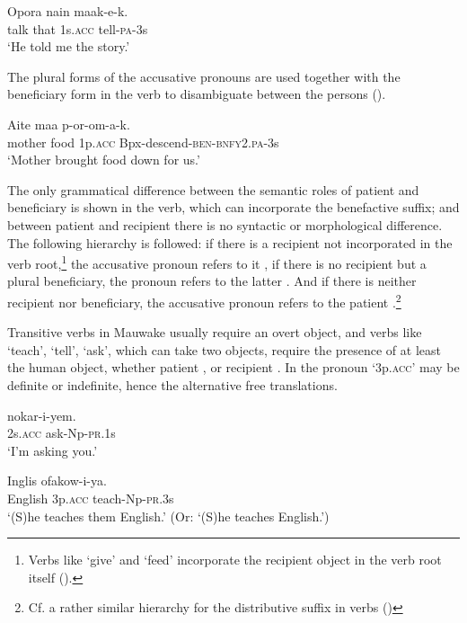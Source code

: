 \ea%
\label{ex:3:x550}
\gll Opora nain  maak-e-k. \\
talk that 1s.\textsc{acc} tell-\textsc{pa}-3s\\
\glt`He told me the story.' 
\z

The plural forms of the accusative pronouns are used together with the beneficiary form in the verb to disambiguate between the persons  ().

\ea%
\label{ex:3:x549}
\gll Aite maa  p-or-om-a-k. \\
mother food 1p.\textsc{acc} Bpx-descend-\textsc{ben}-\textsc{bnfy}2.\textsc{pa}-3s\\
\glt`Mother brought food down for us.'
\z

The only grammatical difference between the semantic roles of patient and beneficiary is shown in the verb, which can incorporate the benefactive suffix; and between patient and recipient there is no syntactic or morphological difference. The following hierarchy is followed: if there is a recipient not incorporated in the verb root,\footnote{Verbs like `give' and `feed' incorporate the recipient object in the verb root itself ().} the accusative pronoun refers to it , if there is no recipient but a plural beneficiary, the pronoun refers to the latter . And if there is neither recipient nor beneficiary, the accusative pronoun refers to the patient .\footnote{Cf. a rather similar hierarchy for the distributive suffix in verbs ()} 

Transitive verbs in Mauwake usually require an overt object, and verbs like `teach', `tell', `ask', which can take two objects, require the presence of at least the human object, whether patient , or recipient . In  the pronoun  `3p.\textsc{acc}' may be definite or indefinite, hence the alternative free translations.

\ea%
\label{ex:3:x552}
\gll {} nokar-i-yem. \\
2s.\textsc{acc} ask-Np-\textsc{pr}.1s\\
\glt`I'm asking you.'
\z

\ea%
\label{ex:3:x551}
\gll Inglis  ofakow-i-ya. \\
English 3p.\textsc{acc} teach-Np-\textsc{pr}.3s\\
\glt`(S)he teaches them English.' (Or: `(S)he teaches English.')
\z

